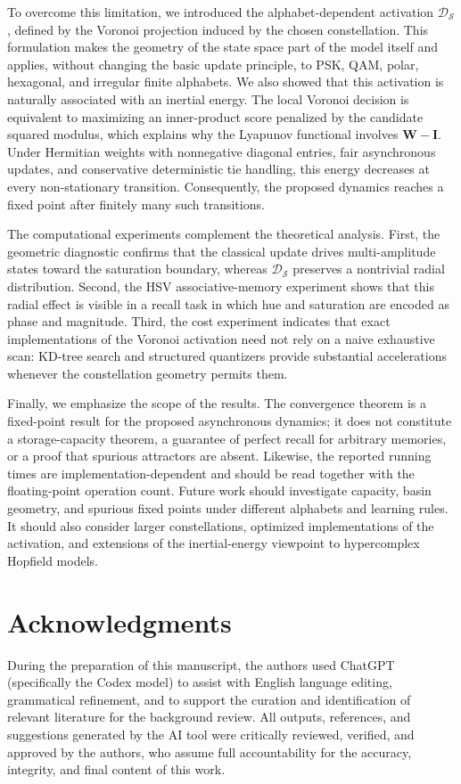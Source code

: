 \documentclass[10pt,journal,letterpaper]{IEEEtran}
\begin{document}
To overcome this limitation, we introduced the alphabet-dependent activation
$\mathcal{D}_{\mathcal{S}}$, defined by the Voronoi projection induced by the
chosen constellation. This formulation makes the geometry of the state space
part of the model itself and applies, without changing the basic update
principle, to PSK, QAM, polar, hexagonal, and irregular finite alphabets. We
also showed that this activation is naturally associated with an inertial
energy. The local Voronoi decision is equivalent to maximizing an
inner-product score penalized by the candidate squared modulus, which explains
why the Lyapunov functional involves $\boldsymbol{W}-\boldsymbol{I}$. Under
Hermitian weights with nonnegative diagonal entries, fair asynchronous updates,
and conservative deterministic tie handling, this energy decreases at every
non-stationary transition. Consequently, the proposed dynamics reaches a fixed
point after finitely many such transitions.

The computational experiments complement the theoretical analysis. First, the
geometric diagnostic confirms that the classical update drives multi-amplitude
states toward the saturation boundary, whereas
$\mathcal{D}_{\mathcal{S}}$ preserves a nontrivial radial distribution. Second,
the HSV associative-memory experiment shows that this radial effect is visible
in a recall task in which hue and saturation are encoded as phase and
magnitude. Third, the cost experiment indicates that exact implementations of
the Voronoi activation need not rely on a naive exhaustive scan: KD-tree search
and structured quantizers provide substantial accelerations whenever the
constellation geometry permits them.

Finally, we emphasize the scope of the results. The convergence theorem is a
fixed-point result for the proposed asynchronous dynamics; it does not
constitute a storage-capacity theorem, a guarantee of perfect recall for
arbitrary memories, or a proof that spurious attractors are absent. Likewise,
the reported running times are implementation-dependent and should be read
together with the floating-point operation count. Future work should investigate capacity, basin
geometry, and spurious fixed points under different alphabets and learning
rules. It should also consider larger constellations, optimized implementations
of the activation, and extensions of the inertial-energy viewpoint to
hypercomplex Hopfield models.


\section*{Acknowledgments}
During the preparation of this manuscript, the authors used ChatGPT (specifically the Codex model) to assist with English language editing, grammatical refinement, and to support the curation and identification of relevant literature for the background review. All outputs, references, and suggestions generated by the AI tool were critically reviewed, verified, and approved by the authors, who assume full accountability for the accuracy, integrity, and final content of this work.



\end{document}
